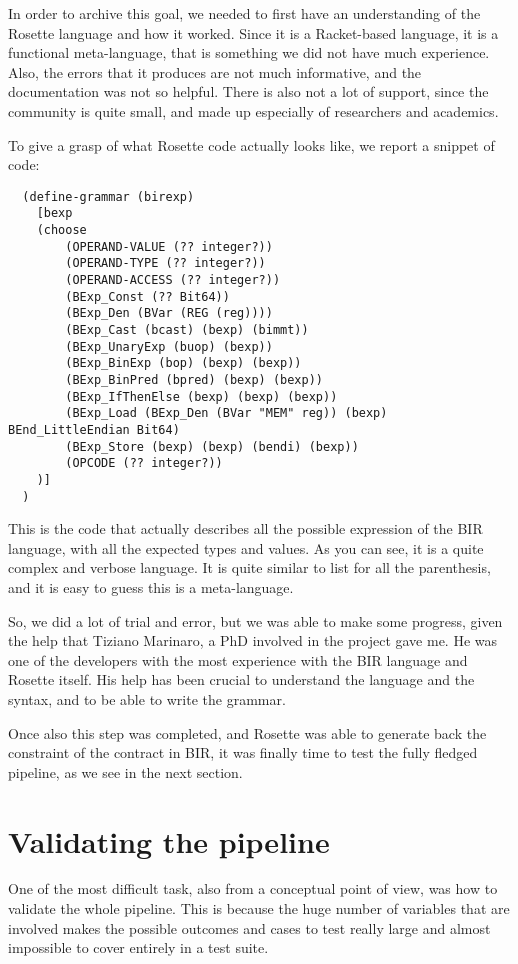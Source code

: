 In order to archive this goal, we needed to first have an understanding of the
Rosette language and how it worked. Since it is a Racket-based language, it is a
functional meta-language, that is something we did not have much experience.
Also, the errors that it produces are not much informative, and the
documentation was not so helpful. There is also not a lot of support, since the
community is quite small, and made up especially of researchers and academics.

To give a grasp of what Rosette code actually looks like, we report a snippet of
code:

\begin{verbatim}
  (define-grammar (birexp)
    [bexp
    (choose
        (OPERAND-VALUE (?? integer?))
        (OPERAND-TYPE (?? integer?))
        (OPERAND-ACCESS (?? integer?))
        (BExp_Const (?? Bit64))
        (BExp_Den (BVar (REG (reg))))
        (BExp_Cast (bcast) (bexp) (bimmt))
        (BExp_UnaryExp (buop) (bexp))
        (BExp_BinExp (bop) (bexp) (bexp))
        (BExp_BinPred (bpred) (bexp) (bexp))
        (BExp_IfThenElse (bexp) (bexp) (bexp))
        (BExp_Load (BExp_Den (BVar "MEM" reg)) (bexp) BEnd_LittleEndian Bit64)
        (BExp_Store (bexp) (bexp) (bendi) (bexp))
        (OPCODE (?? integer?))
    )]
  )
\end{verbatim}

This is the code that actually describes all the possible expression of the BIR language,
with all the expected types and values. As you can see, it is a quite complex
and verbose language. It is quite similar to list for all the parenthesis, and
it is easy to guess this is a meta-language.

So, we did a lot of trial and error, but we was able to make some progress, given
the help that Tiziano Marinaro, a PhD involved in the project gave me. He was one
of the developers with the most experience with the BIR language and Rosette itself.
His help has been crucial to understand the language and the syntax, and to be able
to write the grammar.

Once also this step was completed, and Rosette was able to generate back the
constraint of the contract in BIR, it was finally time to test the fully fledged
pipeline, as we see in the next section.

\section{Validating the pipeline}
\label{cha:Validating the pipeline} One of the most difficult task, also from a conceptual
point of view, was how to validate the whole pipeline. This is because the huge number
of variables that are involved makes the possible outcomes and cases to test really
large and almost impossible to cover entirely in a test suite.

